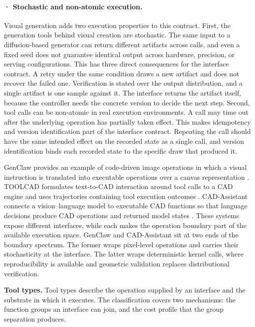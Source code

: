 \paragraph{· Stochastic and non-atomic execution.} Visual generation adds two execution properties to this contract. First, the generation tools behind visual creation are stochastic. The same input to a diffusion-based generator can return different artifacts across calls, and even a fixed seed does not guarantee identical output across hardware, precision, or serving configurations. This has three direct consequences for the interface contract. A retry under the same condition draws a new artifact and does not recover the failed one. Verification is stated over the output distribution, and a single artifact is one sample against it. The interface returns the artifact itself, because the controller needs the concrete version to decide the next step. Second, tool calls can be non-atomic in real execution environments. A call may time out after the underlying operation has partially taken effect. This makes idempotency and version identification part of the interface contract. Repeating the call should have the same intended effect on the recorded state as a single call, and version identification binds each recorded state to the specific draw that produced it.

GenClaw provides an example of code-driven image operations in which a visual instruction is translated into executable operations over a canvas representation \cite{ye2026genclaw}. TOOLCAD formulates text-to-CAD interaction around tool calls to a CAD engine and uses trajectories containing tool execution outcomes \cite{gong2026toolcad}. CAD-Assistant connects a vision--language model to executable CAD functions so that language decisions produce CAD operations and returned model states \cite{mallis2024cadassistant}. These systems expose different interfaces, while each makes the operation boundary part of the available execution space. GenClaw and CAD-Assistant sit at two ends of the boundary spectrum. The former wraps pixel-level operations and carries their stochasticity at the interface. The latter wraps deterministic kernel calls, where reproducibility is available and geometric validation replaces distributional verification.

\textbf{Tool types.} Tool types describe the operation supplied by an interface and the substrate in which it executes. The classification covers two mechanisms: the function groups an interface can join, and the cost profile that the group separation produces.

